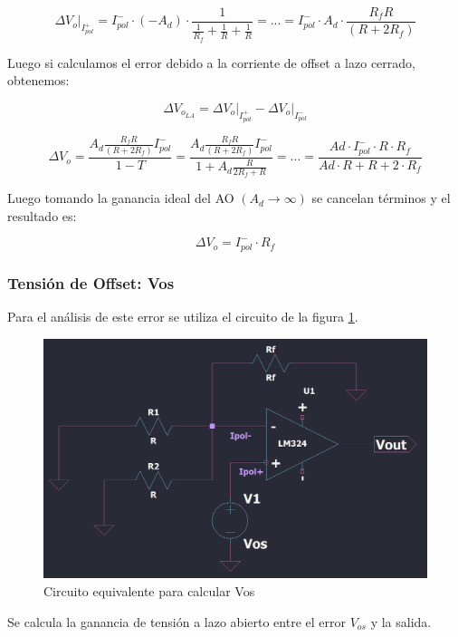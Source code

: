 \[\left.\Delta V_{o} \right|_{I_{pol}^{+}} 
= I_{pol}^{-} \cdot (-A_d) \cdot \frac{1}{\frac{1}{R_f}+\frac{1}{R}+\frac{1}{R}} 
= ... = I_{pol}^{-} \cdot A_d \cdot \frac{R_f R}{(R+2 R_f)} \] 
 
Luego si calculamos el error debido a la corriente de offset a lazo cerrado, obtenemos:

 \[ \Delta V_{o_{LA}} = \left.\Delta V_{o} \right|_{I_{pol}^{+}} - \left.\Delta V_{o} \right|_{I_{pol}^{-}}  \] 



\[
\Delta V_{o}= \frac{A_d \frac{R_f R}{(R+2 R_f)} I_{pol}^{-}}{1 - T} 
= \frac{A_d \frac{R_f R}{(R+2 R_f)} I_{pol}^{-}}{1 + A_d \frac{R}{2 R_f+R}} 
= ... =  \frac{Ad \cdot  I_{pol}^{-} \cdot R \cdot R_f}{Ad \cdot R + R + 2 \cdot R_f} 
\] 

Luego  tomando la ganancia ideal del AO $\left(A_{d} \rightarrow \infty\right)$ se cancelan términos y el resultado es:

\[
\Delta V_{o} 
= I_{pol}^{-} \cdot R_f
\]


\subsubsection{Tensión de Offset: Vos}
 
Para el análisis de este error se utiliza el circuito de la figura \ref{fig:equivalentevos}. 


\begin{figure}[h!]
    \centering
    \includegraphics[width=0.90\linewidth]{img/equivalente_vos.png}
    \caption{Circuito equivalente para calcular Vos}
    \label{fig:equivalentevos}
\end{figure}

Se calcula la ganancia de tensión a lazo abierto entre el error $V_{os}$ y la salida.

